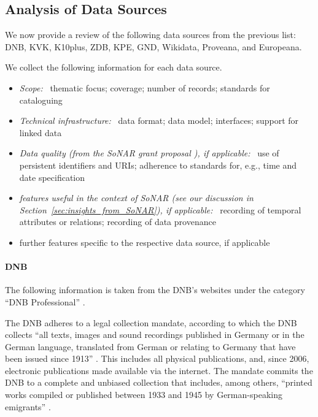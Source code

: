 \subsection{Analysis of Data Sources}
\label{subsec:analysis_data_sources}

We now provide a review of the following data sources from the previous list:
\gls{DNB}, \gls{KVK}, \gls{K10plus}, \gls{ZDB}, \gls{KPE}, \gls{GND}, Wikidata, Proveana, and Europeana.


We collect the following information for each data source.
%
\begin{itemize}
  \item
    \emph{Scope:}~
    thematic focus; coverage; number of records; standards for cataloguing
  \item
    \emph{Technical infrastructure:}~
    data format; data model; interfaces; support for linked data
  \item
    \emph{Data quality (from the \gls{SoNAR} grant proposal \autocite[p.\,19ff.]{SchneiderKempf2018}),
    if applicable:}~
    use of persistent identifiers and \glspl{URI}; adherence to standards for, e.g., time and date specification
  \item
    \emph{features useful in the context of \gls{SoNAR} (see our discussion in Section~\ref{sec:insights_from_SoNAR}), if applicable:}~
    recording of temporal attributes or relations; recording of data provenance
  \item
    further features specific to the respective data source, if applicable
\end{itemize}

\paragraph{DNB}

The following information is taken from the \gls{DNB}'s websites under the category \enquote{DNB Professional} \autocite{DNB_coll_mand,DNB_cataloguing,DNB_metadata}.

The DNB adheres to a legal collection mandate, according to which
the DNB collects \enquote{all texts, images and sound recordings published in Germany or in the German language, translated from German or relating to Germany that have been issued since 1913}  \autocite{DNB_coll_mand}. This includes all physical publications, and, since 2006, electronic publications made available via the internet. The mandate commits the DNB to a complete and unbiased collection that includes, among others, \enquote{printed works compiled or published between 1933 and 1945 by German-speaking emigrants} \autocite{DNB_coll_mand}.

